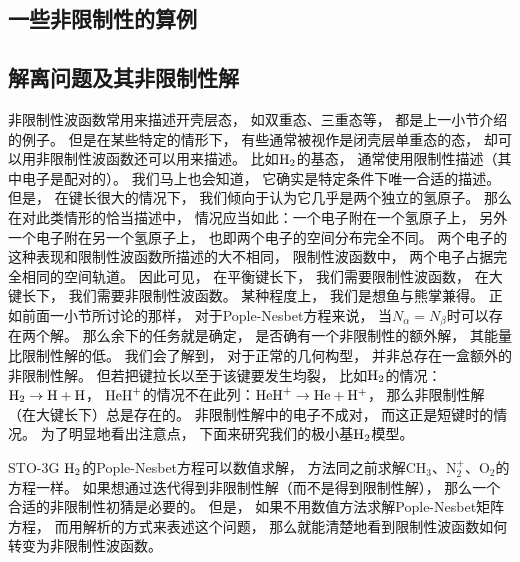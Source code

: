 \subsection{一些非限制性的算例}


\subsection{解离问题及其非限制性解}
非限制性波函数常用来描述开壳层态，
如双重态、三重态等，
都是上一小节介绍的例子。
但是在某些特定的情形下，
有些通常被视作是闭壳层单重态的态，
却可以用非限制性波函数还可以用来描述。
比如$\mathrm{H}_2$的基态，
通常使用限制性描述（其中电子是配对的）。
我们马上也会知道，
它确实是特定条件下唯一合适的\hft 描述。
但是，
在键长很大的情况下，
我们倾向于认为它几乎是两个独立的氢原子。
那么在对此类情形的恰当描述中，
情况应当如此：一个电子附在一个氢原子上，
另外一个电子附在另一个氢原子上，
也即两个电子的空间分布完全不同。
两个电子的这种表现和限制性波函数所描述的大不相同，
限制性波函数中，
两个电子占据完全相同的空间轨道。
因此可见，
在平衡键长下，
我们需要限制性波函数，
在大键长下，
我们需要非限制性波函数。
某种程度上，
我们是想鱼与熊掌兼得。
正如前面一小节所讨论的那样，
对于Pople-Nesbet方程来说，
当$N_\alpha=N_\beta$时可以存在两个解。
那么余下的任务就是确定，
是否确有一个非限制性的额外解，
其能量比限制性解的低。
我们会了解到，
对于正常的几何构型，
并非总存在一盒额外的非限制性解。
但若把键拉长以至于该键要发生均裂，
比如$\mathrm{H}_2$的情况：$\mathrm{H}_2\to \mathrm{H+H}$，
$\mathrm{HeH}^+$的情况不在此列：$\mathrm{HeH}^+\to \mathrm{He+H^+}$，
那么非限制性解（在大键长下）总是存在的。
非限制性解中的电子不成对，
而这正是短键时的情况。
为了明显地看出注意点，
下面来研究我们的极小基$\mathrm{H}_2$模型。


STO-3G $\mathrm{H}_2$的Pople-Nesbet方程可以数值求解，
方法同之前求解$\mathrm{CH_3}$、$\mathrm{N_2^+}$、$\mathrm{O_2}$的方程一样。
如果想通过迭代得到非限制性解（而不是得到限制性解），
那么一个合适的非限制性初猜是必要的。
但是，
如果不用数值方法求解Pople-Nesbet矩阵方程，
而用解析的方式来表述这个问题，
那么就能清楚地看到限制性波函数如何转变为非限制性波函数。

